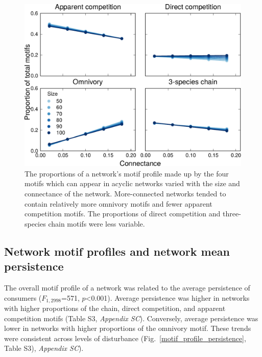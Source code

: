 \documentclass[12pt]{article}
\begin{document}
\begin{spacing}{2.0}
        \begin{figure}[h!]
            \centering
            \includegraphics[width=.75\textwidth]{manuscript/figures/motif_proportion_lms.pdf}
            \caption{The proportions of a network's motif profile made up by the four motifs which can appear in acyclic networks varied with the size and connectance of the network. More-connected networks tended to contain relatively more omnivory motifs and fewer apparent competition motifs. The proportions of direct competition and three-species chain motifs were less variable.}
            \label{motif_proportion_lms}
        \end{figure}

    \subsection*{Network motif profiles and network mean persistence}
    
        The overall motif profile of a network was related to the average persistence of consumers ($F_{1,2998}$=571, $p$\textless0.001). 
        Average persistence was higher in networks with higher proportions of the chain, direct competition, and apparent competition motifs (Table S3, \emph{Appendix SC}). 
        Conversely, average persistence was lower in networks with higher proportions of the omnivory motif. 
        These trends were consistent across  levels of disturbance (Fig.~\ref{motif_profile_persistence}, Table S3), \emph{Appendix SC}).%


\end{spacing}
\end{document}
